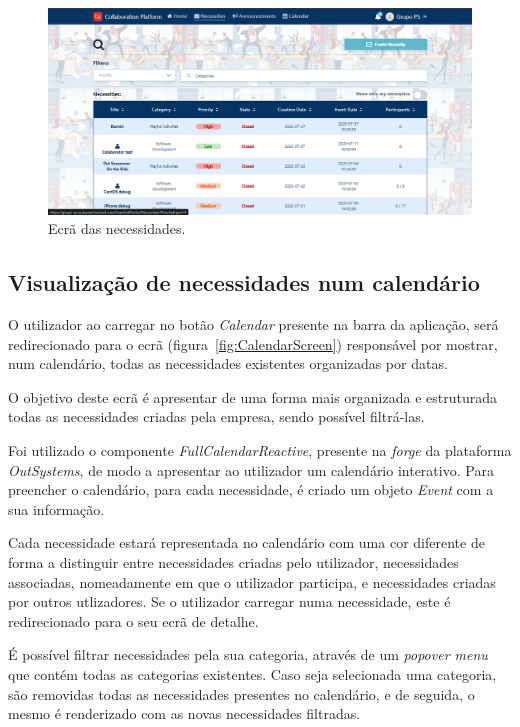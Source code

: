 \begin{figure}[H]
  \centering 
  \includegraphics[scale=0.3]{figures/NecessitiesGeneralScreen.png}
  \caption{Ecrã das necessidades.}\label{fig:NecessitiesScreen}
\end{figure}

\newpage

\subsection{Visualização de necessidades num calendário}\label{subsec:implementacao:calendarNecessitiesView}

O utilizador ao carregar no botão \textit{Calendar} presente na barra da aplicação, será redirecionado para o ecrã (figura~\ref{fig:CalendarScreen}) responsável por mostrar, num calendário, todas as necessidades existentes organizadas por datas. 
\par
O objetivo deste ecrã é apresentar de uma forma mais organizada e estruturada todas as necessidades criadas pela empresa, sendo possível filtrá-las. 
\par
Foi utilizado o componente \textit{FullCalendarReactive}, presente na \textit{forge} da plataforma \textit{OutSystems}, de modo a apresentar ao utilizador um calendário interativo.
Para preencher o calendário, para cada necessidade, é criado um objeto \textit{Event} com a sua informação. 
\par
Cada necessidade estará representada no calendário com uma cor diferente de forma a distinguir entre necessidades criadas pelo utilizador, necessidades associadas, nomeadamente em que o utilizador participa, e necessidades criadas por outros utlizadores.
Se o utilizador carregar numa necessidade, este é redirecionado para o seu ecrã de detalhe. 
\par
É possível filtrar necessidades pela sua categoria, através de um \textit{popover menu} que contém todas as categorias existentes. 
Caso seja selecionada uma categoria, são removidas todas as necessidades presentes no calendário, e de seguida, o mesmo é renderizado com as novas necessidades filtradas.

